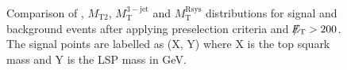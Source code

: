 \begin{figure}[!t]
  \centering
{}
  \caption{Comparison of \met, $M_\mathrm{T2}$, $M_\mathrm{T}^\mathrm{3-jet}$ and $M_\mathrm{T}^\mathrm{Rsys}$ distributions for signal and background events after applying preselection criteria and $\slash\mkern-12mu{E}_{\text{T}} > 200$\gev. The signal points are labelled as (X, Y) where X is the top squark mass and Y is the LSP mass in GeV.}
  \label{fig:stop_ref_plots}
\end{figure} 
